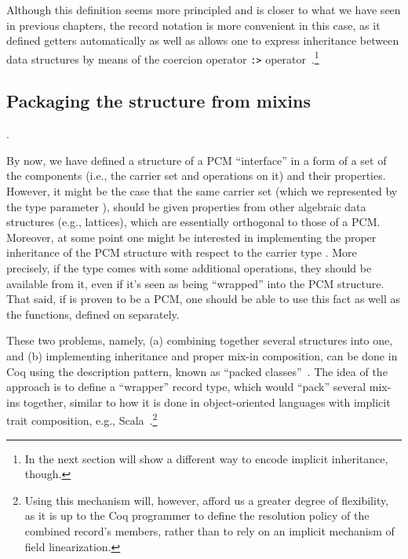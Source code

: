 Although this definition seems more principled and is closer to what
we have seen in previous chapters, the record notation is more
convenient in this case, as it defined getters automatically as well
as allows one to express inheritance between data structures by means
of the coercion operator \texttt{:>}
operator~\cite{Garillot-al:TPHOL09}.\footnote{In the next section
will show a different way to encode implicit inheritance, though.}


\subsection{Packaging the structure from mixins}


\label{sec:packaging}


\begin{coqdoccode}
\coqdocemptyline
\coqdocnoindent
{} .\coqdoceol
\coqdocemptyline
\end{coqdoccode}




By now, we have defined a structure of a PCM ``interface'' in a form of
a set of the components (i.e., the carrier set and operations on it)
and their properties. However, it might be the case that the same
carrier set (which we represented by the type parameter ), should
be given properties from other algebraic data structures (e.g.,
lattices), which are essentially orthogonal to those of a
PCM. Moreover, at some point one might be interested in implementing
the proper inheritance of the PCM structure with respect to the
carrier type . More precisely, if the type  comes with some
additional operations, they should be available from it, even if it's
seen as being ``wrapped'' into the PCM structure. That said, if  is
proven to be a PCM, one should be able to use this fact as well as the
functions, defined on  separately.




These two problems, namely, (a) combining together several structures
into one, and (b) implementing inheritance and proper mix-in
composition, can be done in Coq using the description pattern, known
as ``packed classes''~\cite{Garillot-al:TPHOL09}. The idea of the
approach is to define a ``wrapper'' record type, which would ``pack''
several mix-ins together, similar to how it is done in object-oriented
languages with implicit trait composition, e.g.,
Scala~\cite{Odersky-Zenger:OOPSLA05}.\footnote{Using this mechanism
will, however, afford us a greater degree of flexibility, as it is up
to the Coq programmer to define the resolution policy of the combined
record's members, rather than to rely on an implicit mechanism of
field linearization.}


